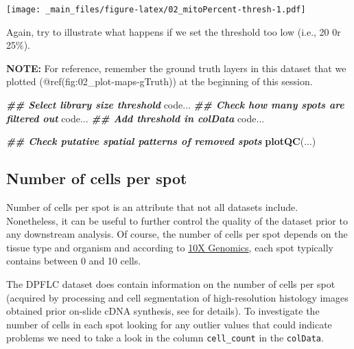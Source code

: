 \documentclass[
]{book}
\newenvironment{Shaded}{\begin{snugshade}}{\end{snugshade}}
\newcommand{\DocumentationTok}[1]{\textcolor[rgb]{0.56,0.35,0.01}{\textbf{\textit{#1}}}}
\newcommand{\FunctionTok}[1]{\textcolor[rgb]{0.13,0.29,0.53}{\textbf{#1}}}
\newcommand{\NormalTok}[1]{#1}
\begin{document}
\texttt{[image: \_main\_files/figure-latex/02\_mitoPercent-thresh-1.pdf]}

Again, try to illustrate what happens if we set the threshold too low (i.e., 20 0r 25\%).

\textbf{NOTE:} For reference, remember the ground truth layers in this dataset that we plotted (@ref(fig:02\_plot-maps-gTruth)) at the beginning of this session.

\begin{Shaded}
\begin{Highlighting}[]
\DocumentationTok{\#\# Select library size threshold}
\NormalTok{code...}
\DocumentationTok{\#\# Check how many spots are filtered out}
\NormalTok{code...}
\DocumentationTok{\#\# Add threshold in colData}
\NormalTok{code...}

\DocumentationTok{\#\# Check putative spatial patterns of removed spots}
\FunctionTok{plotQC}\NormalTok{(...)}
\end{Highlighting}
\end{Shaded}

\hypertarget{number-of-cells-per-spot}{%
\subsection{Number of cells per spot}\label{number-of-cells-per-spot}}

Number of cells per spot is an attribute that not all datasets include. Nonetheless, it can be useful to further control the quality of the dataset prior to any downstream analysis. Of course, the number of cells per spot depends on the tissue type and organism and according to \href{https://kb.10xgenomics.com/hc/en-us/articles/360035487952-How-many-cells-are-captured-in-a-single-spot-}{10X Genomics}, each spot typically contains between 0 and 10 cells.

The DPFLC dataset does contain information on the number of cells per spot (acquired by processing and cell segmentation of high-resolution histology images obtained prior on-slide cDNA synthesis, see \citet{Maynard2021Mar} for details). To investigate the number of cells in each spot looking for any outlier values that could indicate problems we need to take a look in the column \texttt{cell\_count} in the \texttt{colData}.
\end{document}
